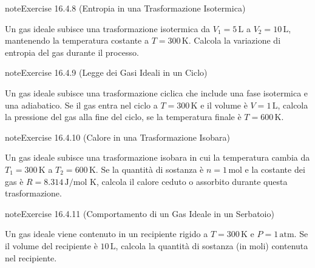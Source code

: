\documentclass[letterpaper,10pt,italian]{jupyterBook}
\begin{document}
\begin{sphinxadmonition}{note}{Exercise 16.4.8 (Entropia in una Trasformazione Isotermica)}



\sphinxAtStartPar
Un gas ideale subisce una trasformazione isotermica da \(V_1 = 5 \, \text{L}\) a \(V_2 = 10 \, \text{L}\), mantenendo la temperatura costante a \(T = 300 \, \text{K}\). Calcola la variazione di entropia del gas durante il processo.
\end{sphinxadmonition}
 \label{exercise:ch/thermodynamics/matter-problems-exercise-8}

\begin{sphinxadmonition}{note}{Exercise 16.4.9 (Legge dei Gasi Ideali in un Ciclo)}



\sphinxAtStartPar
Un gas ideale subisce una trasformazione ciclica che include una fase isotermica e una adiabatico. Se il gas entra nel ciclo a \(T = 300 \, \text{K}\) e il volume è \(V = 1 \, \text{L}\), calcola la pressione del gas alla fine del ciclo, se la temperatura finale è \(T = 600 \, \text{K}\).
\end{sphinxadmonition}
 \label{exercise:ch/thermodynamics/matter-problems-exercise-9}

\begin{sphinxadmonition}{note}{Exercise 16.4.10 (Calore in una Trasformazione Isobara)}



\sphinxAtStartPar
Un gas ideale subisce una trasformazione isobara in cui la temperatura cambia da \(T_1 = 300 \, \text{K}\) a \(T_2 = 600 \, \text{K}\). Se la quantità di sostanza è \(n = 1 \, \text{mol}\) e la costante dei gas è \(R = 8.314 \, \text{J/mol K}\), calcola il calore ceduto o assorbito durante questa trasformazione.
\end{sphinxadmonition}
 \label{exercise:ch/thermodynamics/matter-problems-exercise-10}

\begin{sphinxadmonition}{note}{Exercise 16.4.11 (Comportamento di un Gas Ideale in un Serbatoio)}



\sphinxAtStartPar
Un gas ideale viene contenuto in un recipiente rigido a \(T = 300 \, \text{K}\) e \(P = 1 \, \text{atm}\). Se il volume del recipiente è \(10 \, \text{L}\), calcola la quantità di sostanza (in moli) contenuta nel recipiente.
\end{sphinxadmonition}
 \label{exercise:ch/thermodynamics/matter-problems-exercise-11}
\end{document}
